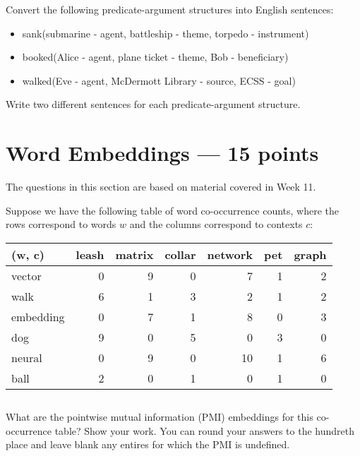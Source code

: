 \documentclass[12pt,a4paper]{article}
\begin{document}
Convert the following predicate-argument structures into English sentences:

\begin{itemize}
\item sank(submarine - agent, battleship - theme, torpedo - instrument)
\item booked(Alice - agent, plane ticket - theme, Bob - beneficiary)
\item walked(Eve - agent, McDermott Library - source, ECSS - goal)
\end{itemize}

Write two different sentences for each predicate-argument structure.

\pagebreak

\section{Word Embeddings --- 15 points}

The questions in this section are based on material covered in Week 11.

Suppose we have the following table of word co-occurrence counts, where the rows correspond to words $w$ and the columns correspond to contexts $c$:

\begin{center}
\begin{tabular}{l | r r r r r r}
(w, c) & leash & matrix & collar & network & pet & graph \\
\midrule
vector & 0 & 9 & 0 & 7 & 1 & 2 \\
walk & 6 & 1 & 3 & 2 & 1 & 2 \\
embedding & 0 & 7 & 1 & 8 & 0 & 3 \\
dog & 9 & 0 & 5 & 0 & 3 & 0 \\
neural & 0 & 9 & 0 & 10 & 1 & 6 \\ 
ball & 2 & 0 & 1 & 0 & 1 & 0 \\
\end{tabular}
\end{center}

\subsection{}

What are the pointwise mutual information (PMI) embeddings for this co-occurrence table? Show your work. You can round your answers to the hundreth place and leave blank any entires for which the PMI is undefined.

\subsection{}
\end{document}
